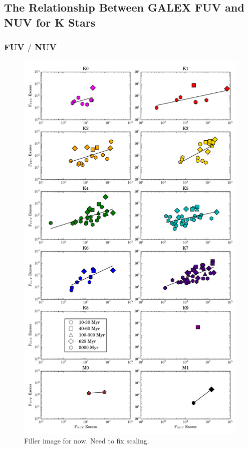 \documentclass[twocolumn]{aastex62}
\begin{document}
\subsection{The Relationship Between GALEX FUV and NUV for K Stars}
\subsubsection{FUV $/$ NUV}

\begin{figure}[t]
\centering
\includegraphics[width=\linewidth]{nuv_vs_fuv_10_NO_J_Kspt.pdf}
\caption{Filler image for now. Need to fix scaling. \label{fig:nuv_vs_fuv}}
\end{figure}
\end{document}

